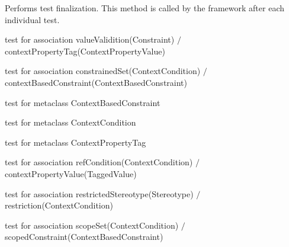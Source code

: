 \begin{desc}Performs test finalization.
 This method is called by the framework after each individual test.
\end{desc}

\begin{desc}test for association
 valueValidition(Constraint) $/$ contextPropertyTag(ContextPropertyValue)
\end{desc}

\begin{desc}test for association
 constrainedSet(ContextCondition) $/$ contextBasedConstraint(ContextBasedConstraint)
\end{desc}

\begin{desc}test for metaclass ContextBasedConstraint
\end{desc}

\begin{desc}test for metaclass ContextCondition
\end{desc}

\begin{desc}test for metaclass ContextPropertyTag
\end{desc}

\begin{desc}test for association
 refCondition(ContextCondition) $/$ contextPropertyValue(TaggedValue)
\end{desc}

\begin{desc}test for association
 restrictedStereotype(Stereotype) $/$ restriction(ContextCondition)
\end{desc}

\begin{desc}test for association
 scopeSet(ContextCondition) $/$ scopedConstraint(ContextBasedConstraint)
\end{desc}

